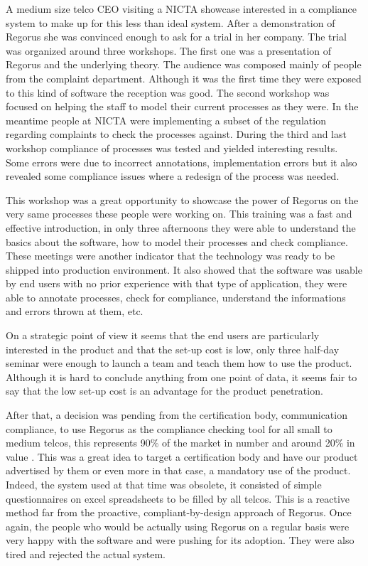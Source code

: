 \documentclass[10pt]{report}
\begin{document}
A medium size telco CEO visiting a NICTA showcase interested in a compliance system to make up for this less than ideal system. After a demonstration of Regorus she was convinced enough to ask for a trial in her company. The trial was organized around three workshops. The first one was a presentation of Regorus and the underlying theory. The audience was composed mainly of people from the complaint department. Although it was the first time they were exposed to this kind of software the reception was good. The second workshop was focused on helping the staff to model their current processes as they were. In the meantime people at NICTA were implementing a subset of the regulation regarding complaints to check the processes against. During the third and last workshop compliance of processes was tested and yielded interesting results. Some errors were due to incorrect annotations, implementation errors but it also revealed some compliance issues where a redesign of the process was needed.

This workshop was a great opportunity to showcase the power of Regorus on the very same processes these people were working on. This training was a fast and effective introduction, in only three afternoons they were able to understand the basics about the software, how to model their processes and check compliance. These meetings were another indicator that the technology was ready to be shipped into production environment. It also showed that the software was usable by end users with no prior experience with that type of application, they were able to annotate processes, check for compliance, understand the informations and errors thrown at them, etc.

On a strategic point of view it seems that the end users are particularly interested in the product and that the set-up cost is low, only three half-day seminar were enough to launch a team and teach them how to use the product. Although it is hard to conclude anything from one point of data, it seems fair to say that the low set-up cost is an advantage for the product penetration. 

After that, a decision was pending from the certification body, communication compliance, to use Regorus as the compliance checking tool for all small to medium telcos, this represents 90\% of the market in number and around 20\% in value \autocite{telcoIndustryStats}. This was a great idea to target a certification body and have our product advertised by them or even more in that case, a mandatory use of the product. Indeed, the system used at that time was obsolete, it consisted of simple questionnaires on excel spreadsheets to be filled by all telcos. This is a reactive method far from the proactive, compliant-by-design approach of Regorus. Once again, the people who would be actually using Regorus on a regular basis were very happy with the software and were pushing for its adoption. They were also tired and rejected the actual system.
\end{document}
